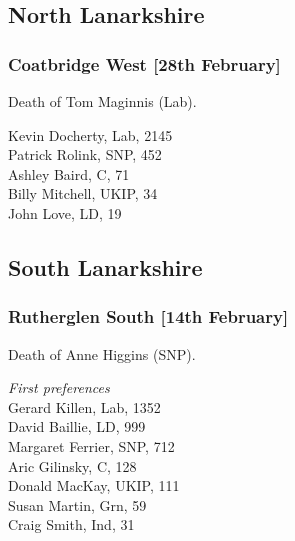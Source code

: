 \documentclass[a4paper,openany,10pt]{book}
\begin{document}
\subsection*{North Lanarkshire}

\subsubsection*{Coatbridge West \hspace*{\fill}\nolinebreak[1]%
\enspace\hspace*{\fill}
[28th February]}


Death of Tom Maginnis (Lab).



Kevin Docherty, Lab, 2145\\
Patrick Rolink, SNP, 452\\
Ashley Baird, C, 71\\
Billy Mitchell, UKIP, 34\\
John Love, LD, 19\\


\subsection*{South Lanarkshire}

\subsubsection*{Rutherglen South \hspace*{\fill}\nolinebreak[1]%
\enspace\hspace*{\fill}
[14th February]}


Death of Anne Higgins (SNP).



\emph{First preferences}\\
Gerard Killen, Lab, 1352\\
David Baillie, LD, 999\\
Margaret Ferrier, SNP, 712\\
Aric Gilinsky, C, 128\\
Donald MacKay, UKIP, 111\\
Susan Martin, Grn, 59\\
Craig Smith, Ind, 31\\
\end{document}
